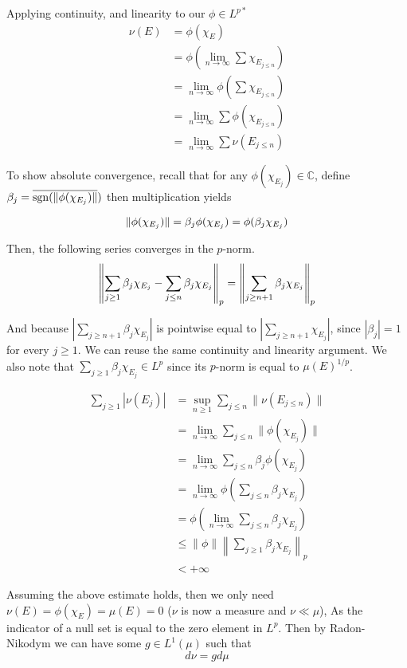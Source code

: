 \documentclass[../../main.tex]{subfiles}
\begin{document}
Applying continuity, and linearity to our $\phi\in L^{p*}$
\begin{align*}
    \nu(E) &= \phi(\chi_E)\\[2ex]
    &= \phi\left(\lim_{n\to\infty} \sum \chi_{E_{j\leq n}}\right)\\[2ex]
    &= \lim_{n\to\infty} \phi\left(\sum \chi_{E_{j\leq n}}\right)\\[2ex]
    &= \lim_{n\to\infty} \sum \phi\left(\chi_{E_{j\leq n}}\right)\\[2ex]
    &= \lim_{n\to\infty} \sum \nu(E_{j\leq n})
\end{align*}

To show absolute convergence, recall that for any $\phi(\chi_{E_j})\in\mathbb{C}$, define $\beta_j = \overline{\operatorname{sgn}(\lVert {\phi(\chi_{E_j})} \rVert})$ then multiplication yields

$$
\lVert {\phi(\chi_{E_j})} \rVert = \beta_j\phi(\chi_{E_j}) = \phi(\beta_j\chi_{E_j})
$$

Then, the following series converges in the $p$-norm.
$$
\left\lVert {\sum_{j\geq 1} \beta_j\chi_{E_j} - \sum_{j\leq n} \beta_j\chi_{E_j}} \right\rVert_p  = \left\lVert {\sum_{j\geq n+1} \beta_j\chi_{E_j}} \right\rVert_p
$$

And because $\left|\sum_{j\geq n+1} \beta_j\chi_{E_j}\right|$ is pointwise equal to $\left|\sum_{j\geq n+1} \chi_{E_j}\right|$, since $|\beta_j|=1$ for every $j\geq 1$. We can reuse the same continuity and linearity argument. We also note that $\sum_{j\geq 1} \beta_j\chi_{E_j}\in L^p$  since its $p$-norm is equal to $\mu(E)^{1/p}$.

\begin{align*}
    \sum_{j\geq 1} \left|\nu(E_j)\right|&=\sup_{n\geq 1} \sum_{j\leq n} \lVert \nu(E_{j\leq n})\rVert\\[1ex]
    &= \lim_{n\to\infty} \sum_{j\leq n} \lVert \phi(\chi_{E_j})\rVert\\[1ex]
    &= \lim_{n\to\infty} \sum_{j\leq n} \beta_j\phi(\chi_{E_j})\\[1ex]
    &= \lim_{n\to\infty} \phi\left(\sum_{j\leq n}\beta_j\chi_{E_j}\right)\\[2ex]
    &= \phi\left(\lim_{n\to\infty} \sum_{j\leq n}\beta_j\chi_{E_j}\right)\\[2ex]
    &\leq \lVert \phi \rVert \left\lVert \sum_{j\geq 1} \beta_j\chi_{E_j}\right\rVert_p\\[1ex]
    &< +\infty
\end{align*}

Assuming the above estimate holds, then we only need $\nu(E) = \phi(\chi_E) = \mu(E) = 0$ ($\nu$ is now a measure and $\nu\ll\mu$), As the indicator of a null set is equal to the zero element in $L^p$. Then by Radon-Nikodym we can have some $g\in L^1(\mu)$ such that 
$$
d\nu = gd\mu
$$
\end{document}
